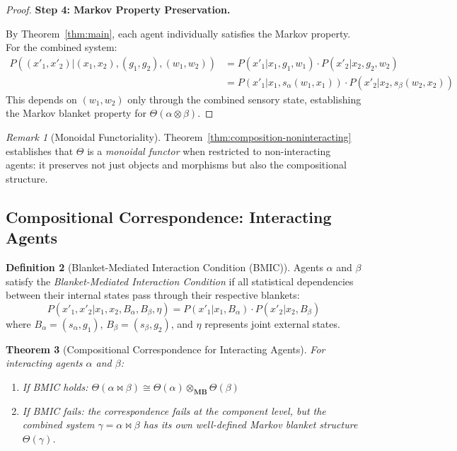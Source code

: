 \documentclass[11pt,a4paper]{article}
\theoremstyle{definition}
\newtheorem{definition}{Definition}[section]
\theoremstyle{plain}
\newtheorem{theorem}[definition]{Theorem}
\theoremstyle{remark}
\newtheorem{remark}[definition]{Remark}
\newcommand{\MB}{\mathbf{MB}}
\begin{document}
\begin{proof}
\textbf{Step 4: Markov Property Preservation.}

By Theorem~\ref{thm:main}, each agent individually satisfies the Markov property. For the combined system:
\begin{align*}
P((x'_1, x'_2) | (x_1, x_2), (g_1, g_2), (w_1, w_2)) &= P(x'_1 | x_1, g_1, w_1) \cdot P(x'_2 | x_2, g_2, w_2) \\
&= P(x'_1 | x_1, s_\alpha(w_1, x_1)) \cdot P(x'_2 | x_2, s_\beta(w_2, x_2))
\end{align*}
This depends on $(w_1, w_2)$ only through the combined sensory state, establishing the Markov blanket property for $\Theta(\alpha \otimes \beta)$.
\end{proof}

\begin{remark}[Monoidal Functoriality]
Theorem~\ref{thm:composition-noninteracting} establishes that $\Theta$ is a \emph{monoidal functor} when restricted to non-interacting agents: it preserves not just objects and morphisms but also the compositional structure.
\end{remark}

\subsection{Compositional Correspondence: Interacting Agents}

\begin{definition}[Blanket-Mediated Interaction Condition (BMIC)]\label{def:bmic}
Agents $\alpha$ and $\beta$ satisfy the \emph{Blanket-Mediated Interaction Condition} if all statistical dependencies between their internal states pass through their respective blankets:
\[
P(x'_1, x'_2 | x_1, x_2, B_\alpha, B_\beta, \eta) = P(x'_1 | x_1, B_\alpha) \cdot P(x'_2 | x_2, B_\beta)
\]
where $B_\alpha = (s_\alpha, g_1)$, $B_\beta = (s_\beta, g_2)$, and $\eta$ represents joint external states.
\end{definition}

\begin{theorem}[Compositional Correspondence for Interacting Agents]\label{thm:composition-interacting}
For interacting agents $\alpha$ and $\beta$:
\begin{enumerate}[label=(\roman*)]
    \item If BMIC holds: $\Theta(\alpha \bowtie \beta) \cong \Theta(\alpha) \otimes_{\MB} \Theta(\beta)$
    \item If BMIC fails: the correspondence fails at the component level, but the combined system $\gamma = \alpha \bowtie \beta$ has its own well-defined Markov blanket structure $\Theta(\gamma)$.
\end{enumerate}
\end{theorem}
\end{document}
